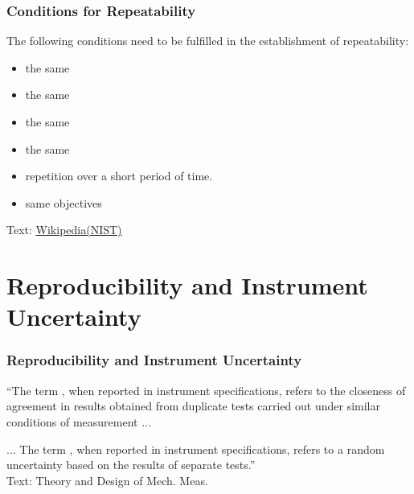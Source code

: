 \documentclass[fleqn]{beamer} %
\newcommand{\sectiontitleII}{Conditions for Repeatability}
\newcommand{\sectiontitleIII}{Reproducibility and Instrument Uncertainty}
\begin{document}
\begin{frame}[label=sectionII]
\frametitle{\sectiontitleII}

The following conditions need to be fulfilled in the establishment of repeatability:
\begin{itemize}

\item the same \hspcuu
\item the same \hspcuu
\item the same \hspcuu
\item the same \hspcuu
\item repetition over a short period of time.
\item same objectives


\end{itemize}
\vspace{5mm}
{\tiny Text: \href{https://en.wikipedia.org/wiki/Repeatability}{Wikipedia(NIST)} }

\end{frame}

\section{\sectiontitleIII}

\begin{frame}[label=sectionIII]
\frametitle{\sectiontitleIII}

``The term \hspcuu, when reported in instrument specifications, refers to the closeness of
agreement in results obtained from duplicate tests carried out under similar conditions of
measurement ... \vspcc

... The term \hspcuu \hspcc \hspcuu, when reported in instrument specifications, refers to a random
uncertainty based on the results of separate \hspcuu tests.'' \vspace{10mm} \\

{\tiny Text: Theory and Design of Mech. Meas.}

\end{frame}
\end{document}
